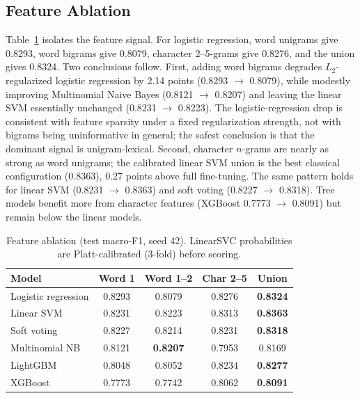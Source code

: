 \documentclass[10pt,journal]{IEEEtran}
\begin{document}
\subsection{Feature Ablation}
Table~\ref{tab:ablation} isolates the feature signal. For logistic regression, word unigrams give 0.8293, word bigrams give 0.8079, character 2--5-grams give 0.8276, and the union gives 0.8324. Two conclusions follow. First, adding word bigrams degrades $L_2$-regularized logistic regression by 2.14 points (0.8293 $\rightarrow$ 0.8079), while modestly improving Multinomial Naive Bayes (0.8121 $\rightarrow$ 0.8207) and leaving the linear SVM essentially unchanged (0.8231 $\rightarrow$ 0.8223). The logistic-regression drop is consistent with feature sparsity under a fixed regularization strength, not with bigrams being uninformative in general; the safest conclusion is that the dominant signal is unigram-lexical. Second, character $n$-grams are nearly as strong as word unigrams; the calibrated linear SVM union is the best classical configuration (0.8363), 0.27 points above full fine-tuning. The same pattern holds for linear SVM (0.8231 $\rightarrow$ 0.8363) and soft voting (0.8227 $\rightarrow$ 0.8318). Tree models benefit more from character features (XGBoost 0.7773 $\rightarrow$ 0.8091) but remain below the linear models.

\begin{table}[t]
\caption{Feature ablation (test macro-F1, seed 42). LinearSVC probabilities are Platt-calibrated (3-fold) before scoring.}
\label{tab:ablation}
\centering
\footnotesize
\setlength{\tabcolsep}{4pt}
\begin{tabular}{lcccc}
\toprule
Model & Word 1 & Word 1--2 & Char 2--5 & Union \\
\midrule
Logistic regression & 0.8293 & 0.8079 & 0.8276 & \textbf{0.8324} \\
Linear SVM          & 0.8231 & 0.8223 & 0.8313 & \textbf{0.8363} \\
Soft voting         & 0.8227 & 0.8214 & 0.8231 & \textbf{0.8318} \\
Multinomial NB      & 0.8121 & \textbf{0.8207} & 0.7953 & 0.8169 \\
LightGBM            & 0.8048 & 0.8052 & 0.8234 & \textbf{0.8277} \\
XGBoost             & 0.7773 & 0.7742 & 0.8062 & \textbf{0.8091} \\
\bottomrule
\end{tabular}
\end{table}
\end{document}
